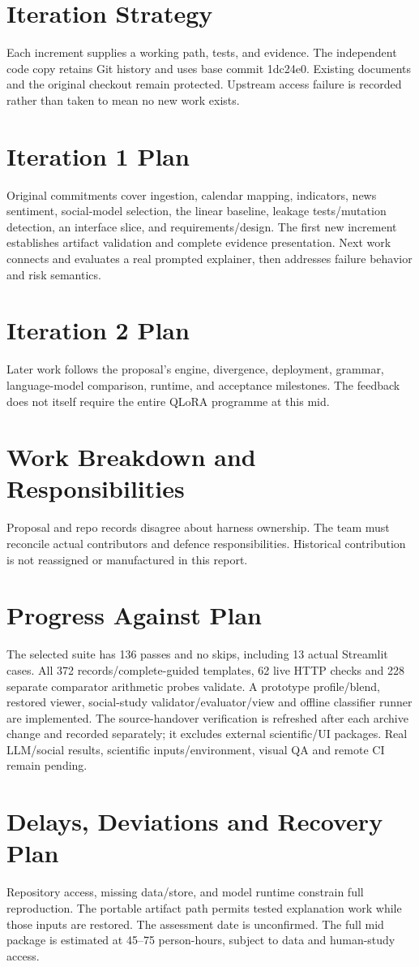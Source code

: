 \section{Iteration Strategy}
Each increment supplies a working path, tests, and evidence. The independent code copy retains Git history and uses base commit 1dc24e0. Existing documents and the original checkout remain protected. Upstream access failure is recorded rather than taken to mean no new work exists.

\section{Iteration 1 Plan}
Original commitments cover ingestion, calendar mapping, indicators, news sentiment, social-model selection, the linear baseline, leakage tests/mutation detection, an interface slice, and requirements/design. The first new increment establishes artifact validation and complete evidence presentation. Next work connects and evaluates a real prompted explainer, then addresses failure behavior and risk semantics.

\section{Iteration 2 Plan}
Later work follows the proposal's engine, divergence, deployment, grammar, language-model comparison, runtime, and acceptance milestones. The feedback does not itself require the entire QLoRA programme at this mid.

\section{Work Breakdown and Responsibilities}
Proposal and repo records disagree about harness ownership. The team must reconcile actual contributors and defence responsibilities. Historical contribution is not reassigned or manufactured in this report.

\section{Progress Against Plan}
The selected suite has 136 passes and no skips, including 13 actual Streamlit cases. All 372 records/complete-guided templates, 62 live HTTP checks and 228 separate comparator arithmetic probes validate. A prototype profile/blend, restored viewer, social-study validator/evaluator/view and offline classifier runner are implemented. The source-handover verification is refreshed after each archive change and recorded separately; it excludes external scientific/UI packages. Real LLM/social results, scientific inputs/environment, visual QA and remote CI remain pending.

\section{Delays, Deviations and Recovery Plan}
Repository access, missing data/store, and model runtime constrain full reproduction. The portable artifact path permits tested explanation work while those inputs are restored. The assessment date is unconfirmed. The full mid package is estimated at 45--75 person-hours, subject to data and human-study access.

